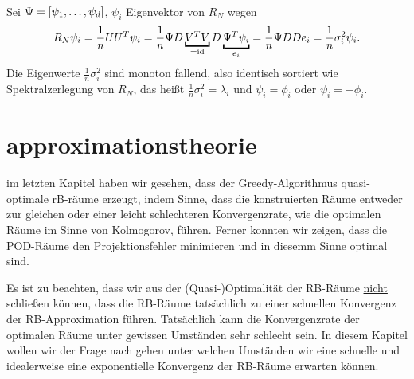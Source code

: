 \\
Sei $\Psi=[\psi_1, \dots ,\psi_d]$, $\psi_i$ Eigenvektor von $R_N$ wegen
\[
R_N\psi_i = \frac{1}{n} UU^T \psi_i = \frac{1}{n} \Psi D \underbracket{V^TV}_{=\id}D \underbracket{\Psi^T\psi_i}_{e_i} = \frac{1}{n} \Psi DD e_i = \frac{1}{n} \sigma_i^2\psi_i.
\]
Die Eigenwerte $\frac{1}{n}\sigma_i^2$ sind monoton fallend, also identisch sortiert wie Spektralzerlegung von $R_N$, das heißt $\frac{1}{n} \sigma_i^2 = \lambda_i$ und $\psi_i=\phi_i$ oder $\psi_i=-\phi_i$.


\section{approximationstheorie}


im letzten Kapitel haben wir gesehen, dass der Greedy-Algorithmus quasi-optimale rB-räume erzeugt, indem Sinne, dass die konstruierten Räume entweder zur gleichen oder einer leicht schlechteren Konvergenzrate, wie die optimalen Räume im Sinne von Kolmogorov, führen.
Ferner konnten wir zeigen, dass die POD-Räume den Projektionsfehler minimieren und in diesemm Sinne optimal sind.

Es ist zu beachten, dass wir aus der (Quasi-)Optimalität der RB-Räume \uline{nicht} schließen können, dass die RB-Räume tatsächlich zu einer schnellen Konvergenz der RB-Approximation führen.
Tatsächlich kann die Konvergenzrate der optimalen Räume unter gewissen Umständen sehr schlecht sein.
In diesem Kapitel wollen wir der Frage nach gehen unter welchen Umständen wir eine schnelle und idealerweise eine exponentielle Konvergenz der RB-Räume erwarten können.

